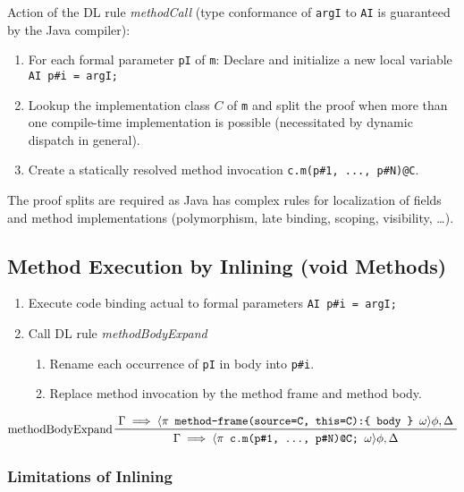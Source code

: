 	Action of the DL rule \textit{methodCall} (type conformance of \texttt{argI} to \texttt{AI} is guaranteed by the Java compiler):
	\begin{enumerate}
		\item For each formal parameter \texttt{pI} of \texttt{m}: Declare and initialize a new local variable \texttt{AI p\#i = argI;}
		\item Lookup the implementation class \(C\) of \texttt{m} and split the proof when more than one compile-time implementation is possible (necessitated by dynamic dispatch in general).
		\item Create a statically resolved method invocation \texttt{c.m(p\#1, ..., p\#N)@C}.
	\end{enumerate}
	The proof splits are required as Java has complex rules for localization of fields and method implementations (polymorphism, late binding, scoping, visibility, \dots).

	\subsection{Method Execution by Inlining (void Methods)}
		\begin{enumerate}
			\item Execute code binding actual to formal parameters \texttt{AI p\#i = argI;}
			\item Call DL rule \textit{methodBodyExpand}
				\begin{enumerate}
					\item Rename each occurrence of \texttt{pI} in body into \texttt{p\#i}.
					\item Replace method invocation by the method frame and method body.
				\end{enumerate}
		\end{enumerate}

		\begin{equation*}
			\prftree[l]
			{methodBodyExpand}
			{\Gamma \implies \langle \pi \texttt{ method-frame(source=C, this=C):\{ body \} } \omega \rangle \phi, \Delta}
			{\Gamma \implies \langle \pi \texttt{ c.m(p\#1, ..., p\#N)@C; } \omega\rangle \phi, \Delta}
		\end{equation*}

		\subsubsection{Limitations of Inlining}
			\label{sec:methodContractMotivation}

